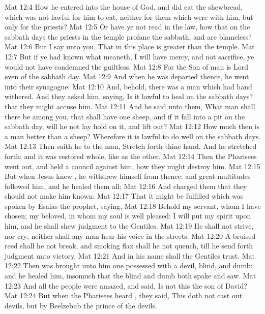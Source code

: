 \vs Mat 12:4 How he entered into the house of God, and did eat the shewbread, which was not lawful for him to eat, neither for them which were with him, but only for the priests?
\vs Mat 12:5 Or have ye not read in the law, how that on the sabbath days the priests in the temple profane the sabbath, and are blameless?
\vs Mat 12:6 But I say unto you, That in this place is  greater than the temple.
\vs Mat 12:7 But if ye had known what  meaneth, I will have mercy, and not sacrifice, ye would not have condemned the guiltless.
\vs Mat 12:8 For the Son of man is Lord even of the sabbath day.
\vs Mat 12:9 And when he was departed thence, he went into their synagogue:
\vs Mat 12:10 And, behold, there was a man which had  hand withered. And they asked him, saying, Is it lawful to heal on the sabbath days? that they might accuse him.
\vs Mat 12:11 And he said unto them, What man shall there be among you, that shall have one sheep, and if it fall into a pit on the sabbath day, will he not lay hold on it, and lift  out?
\vs Mat 12:12 How much then is a man better than a sheep? Wherefore it is lawful to do well on the sabbath days.
\vs Mat 12:13 Then saith he to the man, Stretch forth thine hand. And he stretched  forth; and it was restored whole, like as the other.
\vs Mat 12:14 Then the Pharisees went out, and held a council against him, how they might destroy him.
\vs Mat 12:15 But when Jesus knew , he withdrew himself from thence: and great multitudes followed him, and he healed them all;
\vs Mat 12:16 And charged them that they should not make him known:
\vs Mat 12:17 That it might be fulfilled which was spoken by Esaias the prophet, saying,
\vs Mat 12:18 Behold my servant, whom I have chosen; my beloved, in whom my soul is well pleased: I will put my spirit upon him, and he shall shew judgment to the Gentiles.
\vs Mat 12:19 He shall not strive, nor cry; neither shall any man hear his voice in the streets.
\vs Mat 12:20 A bruised reed shall he not break, and smoking flax shall he not quench, till he send forth judgment unto victory.
\vs Mat 12:21 And in his name shall the Gentiles trust.
\vs Mat 12:22 Then was brought unto him one possessed with a devil, blind, and dumb: and he healed him, insomuch that the blind and dumb both spake and saw.
\vs Mat 12:23 And all the people were amazed, and said, Is not this the son of David?
\vs Mat 12:24 But when the Pharisees heard , they said, This  doth not cast out devils, but by Beelzebub the prince of the devils.
